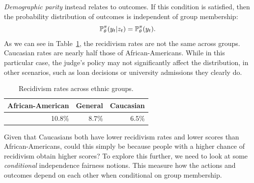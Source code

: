 \begin{frame}
{    \emph{Demographic parity} instead relates to outcomes. If this
    condition is satisfied, then the probability distribution of
    outcomes is independent of group membership:
    \begin{equation}
      \label{eq:eqality-outcomes}
      \mathop{\mbox{\ensuremath{\mathbb{P}}}}\nolimits_\theta^\pi(y_t | z_t) =       \mathop{\mbox{\ensuremath{\mathbb{P}}}}\nolimits_\theta^\pi(y_t ).
    \end{equation}
    As we can see in Table~\ref{tab:recidivism}, the recidivism rates are not the same across groups. Caucasian rates are nearly half those of African-Americans. While in this particular case, the judge's policy may not significantly affect the distribution, in other scenarios, such as loan decisions or university admissions they clearly do. 
    \begin{table}[h]
      \centering
      \begin{tabular}{r|r|r}
        African-American& General & Caucasian\\
        \hline
        10.8\% & 8.7\% & 6.5\% 
      \end{tabular}
      \label{tab:recidivism}
      \caption{Recidivism rates across ethnic groups.}
    \end{table}
    Given that Caucasians both have lower recidivism rates and lower scores than African-Americans, could this simply be because people with a higher chance of recidivism obtain higher scores? To explore this further, we need to look at some \emph{conditional} independence fairness notions. This measure how the actions and outcomes depend on each other when conditional on group membership.
  }
\end{frame}

